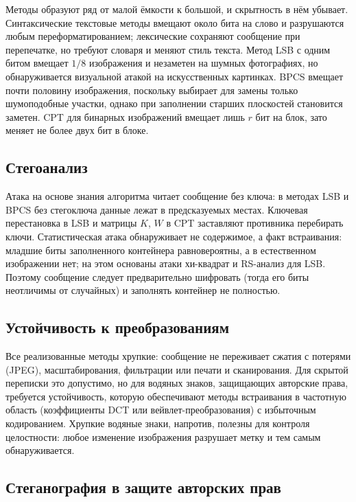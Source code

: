 \documentclass[14pt,a4paper]{extarticle}
\begin{document}
Методы образуют ряд от малой ёмкости к большой, и скрытность в нём убывает.
Синтаксические текстовые методы вмещают около бита на слово и разрушаются любым
переформатированием; лексические сохраняют сообщение при перепечатке, но требуют
словаря и меняют стиль текста. Метод LSB с одним битом вмещает $1/8$ изображения и
незаметен на шумных фотографиях, но обнаруживается визуальной атакой на искусственных
картинках. BPCS вмещает почти половину изображения, поскольку выбирает для замены
только шумоподобные участки, однако при заполнении старших плоскостей становится
заметен. CPT для бинарных изображений вмещает лишь $r$ бит на блок, зато меняет не
более двух бит в блоке.

\subsection{Стегоанализ}

Атака на основе знания алгоритма читает сообщение без ключа: в методах LSB и BPCS без
стегоключа данные лежат в предсказуемых местах. Ключевая перестановка в LSB и
матрицы $K$, $W$ в CPT заставляют противника перебирать ключи. Статистическая атака
обнаруживает не содержимое, а факт встраивания: младшие биты заполненного контейнера
равновероятны, а в естественном изображении нет; на этом основаны атаки хи-квадрат и
RS-анализ для LSB. Поэтому сообщение следует предварительно шифровать (тогда его биты
неотличимы от случайных) и заполнять контейнер не полностью.

\subsection{Устойчивость к преобразованиям}

Все реализованные методы хрупкие: сообщение не переживает сжатия с потерями (JPEG),
масштабирования, фильтрации или печати и сканирования. Для скрытой переписки это
допустимо, но для водяных знаков, защищающих авторские права, требуется устойчивость,
которую обеспечивают методы встраивания в частотную область (коэффициенты DCT или
вейвлет-преобразования) с избыточным кодированием. Хрупкие водяные знаки, напротив,
полезны для контроля целостности: любое изменение изображения разрушает метку и тем
самым обнаруживается.

\subsection{Стеганография в защите авторских прав}
\end{document}
